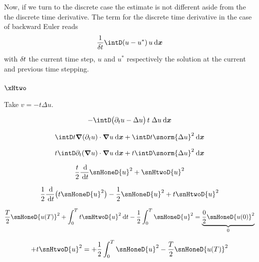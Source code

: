 \medskip
Now, if we turn to the discrete case the estimate is not different aside from the the discrete time derivative.
The term for the discrete time derivative in the case of backward Euler reads
\begin{equation*}
\dfrac{1}{\kt}\intD (u - u^\ast)\, u \dxx
\end{equation*}
with $\delta \hspace{-0.05ex} t$ the current time step, $u$ and $u^\ast$ respectively the solution at the current and previous time stepping.

\subsubsection{$\xHtwo$}

Take $v = - t \Delta u$.

\begin{equation*}
- \intD \bigl(\partial_t u - \Delta u\bigr)\,t\;\Delta u \dxx
\end{equation*}


\begin{equation*}
\intD t \Grad(\partial_t u)\cdot\Grad u  \dxx + \intD t \snorm{\Delta u}^2 \dxx
\end{equation*}

\begin{equation*}
t \intD \partial_t(\Grad u)\cdot\Grad u \dxx + t \intD \snorm{\Delta u}^2 \dxx
\end{equation*}

\begin{equation*}
\dfrac{t}{2}\dfrac{\md}{\dt}\snHoneD{u}^2 + \snHtwoD{u}^2
\end{equation*}

\begin{equation*}
\dfrac{1}{2}\dfrac{\md}{\dt}\bigl(t \snHoneD{u}^2\bigr) - \dfrac{1}{2} \snHoneD{u}^2 + t\snHtwoD{u}^2
\end{equation*}

\begin{equation*}
\dfrac{T}{2}\snHoneD{u(T)}^2 + \int_0^T t\snHtwoD{u}^2 \dt - \dfrac{1}{2}\int_0^T \snHoneD{u}^2 = \underbrace{\dfrac{0}{2}\snHoneD{u(0)}^2}_{0}
\end{equation*}

\begin{equation*}
+ t\snHtwoD{u}^2 = + \dfrac{1}{2}\int_0^T \snHoneD{u}^2 - \dfrac{T}{2}\snHoneD{u(T)}^2
\end{equation*}























